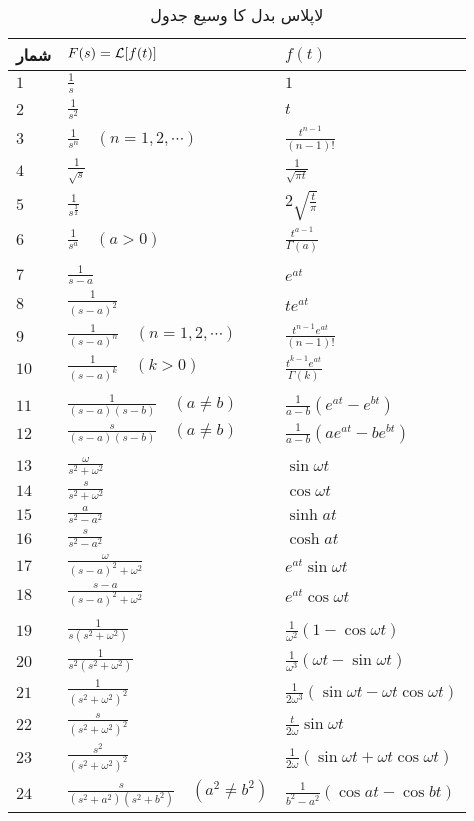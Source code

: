 \begin{table}
\caption{لاپلاس بدل کا وسیع جدول}
\label{جدول_لاپلاس_وسیع}
\centering
\begin{tabular}{lll}
شمار & $F(s)=\mathcal{L}[f(t)]$ & $f(t)$ \Tstrut \\
\hline 
$1$ & $\frac{1}{s}$ & $1$ \Tstrut\\
$2$ & $\frac{1}{s^2}$ & $t$ \Tstrut\\
$3$ & $\frac{1}{s^n}\quad (n=1,2,\cdots)$  & $\frac{t^{n-1}}{(n-1)!}$ \Tstrut\\
$4$ & $\frac{1}{\sqrt{s}}$ & $\frac{1}{\sqrt{\pi t}}$ \Tstrut\\
$5$ & $\frac{1}{s^{\frac{3}{2}}}$ & $2\sqrt{\frac{t}{\pi}}$ \Tstrut\\
$6$ & $\frac{1}{s^a}\quad (a>0)$ & $\frac{t^{a-1}}{\Gamma(a)}$ \Tstrut\\
\\
$7$ & $\frac{1}{s-a}$ & $e^{at}$ \Tstrut\\
$8$ & $\frac{1}{(s-a)^2}$ & $te^{at}$ \Tstrut\\
$9$ & $\frac{1}{(s-a)^n} \quad (n=1,2,\cdots)$ & $\frac{t^{n-1} e^{at}}{(n-1)!}$  \Tstrut\\
$10$ & $\frac{1}{(s-a)^k} \quad (k>0)$ & $\frac{t^{k-1} e^{at}}{\Gamma(k)}$  \Tstrut\\
\\
$11$ & $\frac{1}{(s-a)(s-b)} \quad (a \ne b)$ & $\frac{1}{a-b} (e^{at}-e^{bt})$  \Tstrut\\
$12$ & $\frac{s}{(s-a)(s-b)} \quad (a\ne b)$ & $\frac{1}{a-b}(ae^{at}-be^{bt})$  \Tstrut\\
\\
$13$ & $\frac{\omega}{s^2+\omega^2}$ & $\sin \omega t$  \Tstrut\\
$14$ & $\frac{s}{s^2+\omega^2}$ & $\cos \omega t$  \Tstrut\\
$15$ & $\frac{a}{s^2-a^2}$ & $\sinh at$  \Tstrut\\
$16$ & $\frac{s}{s^2-a^2}$ & $\cosh at$  \Tstrut\\
$17$ & $\frac{\omega}{(s-a)^2+\omega^2}$ & $e^{at}\sin \omega t$  \Tstrut\\
$18$ & $\frac{s-a}{(s-a)^2+\omega^2}$ & $e^{at}\cos \omega t$  \Tstrut\\
\\
$19$ & $\frac{1}{s(s^2+\omega^2)}$ & $\frac{1}{\omega^2} (1-\cos \omega t)$  \Tstrut\\
$20$ & $\frac{1}{s^2(s^2+\omega^2)}$ & $\frac{1}{\omega^3}(\omega t-\sin \omega t)$  \Tstrut\\
$21$ & $\frac{1}{(s^2+\omega^2)^2}$ & $\frac{1}{2\omega^3}(\sin \omega t-\omega t\cos \omega t)$  \Tstrut\\
$22$ & $\frac{s}{(s^2+\omega^2)^2}$ & $\frac{t}{2\omega} \sin \omega t$  \Tstrut\\
$23$ & $\frac{s^2}{(s^2+\omega^2)^2}$ & $\frac{1}{2\omega}(\sin \omega t+\omega t \cos \omega t)$  \Tstrut\\
$24$ & $\frac{s}{(s^2+a^2)(s^2+b^2)}\quad (a^2 \ne b^2)$ & $\frac{1}{b^2-a^2}(\cos at-\cos bt)$   \Tstrut\\
\end{tabular}
\end{table}
